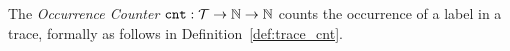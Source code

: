 The \emph{Occurrence Counter} $\mathtt{cnt} : \mathcal{T} \to \mathbb{N} \to \mathbb{N}$ counts the 
occurrence of a label in a trace,
formally as follows in Definition~\ref{def:trace_cnt}.
